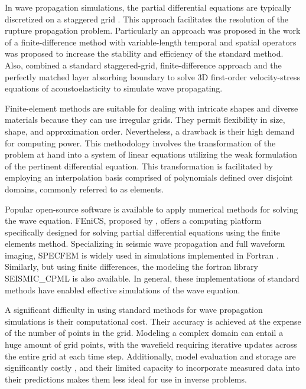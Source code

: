 \documentclass[11pt,twoside]{article}
\begin{document}
In wave propagation simulations, the partial differential equations are typically discretized on a staggered grid 
\citep{madariaga_dynamics_1976,Virieux1986}. This approach facilitates the resolution of the rupture propagation problem. Particularly 
an approach was proposed in the work of  a finite-difference method with variable-length temporal and spatial 
operators was proposed to increase the stability and efficiency of the standard method. Also,  
combined a standard staggered-grid, finite-difference approach and the perfectly matched layer absorbing boundary to solve 3D 
first-order velocity-stress equations of acoustoelasticity to simulate wave propagating.

Finite-element methods are suitable for dealing with intricate shapes and diverse materials because they can use irregular grids. They 
permit flexibility in size, shape, and approximation order. Nevertheless, a drawback is their high demand for computing power. This 
methodology involves the transformation of the problem at hand into a system of linear equations utilizing the weak formulation of the 
pertinent differential equation. This transformation is facilitated by employing an interpolation basis comprised of polynomials defined 
over disjoint domains, commonly referred to as elements.

Popular open-source software is available to apply numerical methods for solving the wave equation. FEniCS, proposed by 
, offers a computing platform specifically designed for solving partial differential equations using 
the finite elements method. Specializing in seismic wave propagation and full waveform imaging, SPECFEM is widely used in simulations 
implemented in Fortran \citep{dimitri_komatitsch_2023_10415228,komatitsch_2024_10823181}. Similarly, but using finite differences, the 
modeling the fortran library SEISMIC\_CPML \citep{komatitsch_unsplit_2007} is also available. In general, these implementations of 
standard methods have enabled effective simulations of the wave equation. 

A significant difficulty in using standard methods for wave propagation simulations is their computational cost. Their accuracy is 
achieved at the expense of the number of points in the grid. Modeling a complex domain can entail a huge amount of grid points, with 
the wavefield requiring iterative updates across the entire grid at each time step. Additionally, model evaluation and storage are 
significantly costly , and their limited capacity to incorporate measured data into their 
predictions makes them less ideal for use in inverse problems.
\end{document}
